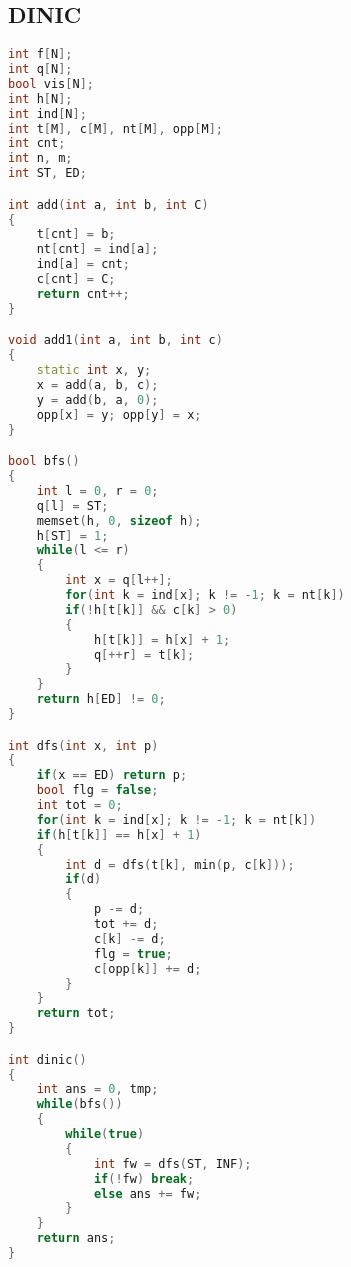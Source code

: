 ﻿\subsection{DINIC}
    \begin{lstlisting}[language=C++]
int f[N];
int q[N];
bool vis[N];
int h[N];
int ind[N];
int t[M], c[M], nt[M], opp[M];
int cnt;
int n, m;
int ST, ED;

int add(int a, int b, int C)
{
    t[cnt] = b;
    nt[cnt] = ind[a];
    ind[a] = cnt;
    c[cnt] = C;
    return cnt++;
}

void add1(int a, int b, int c)
{
    static int x, y;
    x = add(a, b, c);
    y = add(b, a, 0);
    opp[x] = y; opp[y] = x;
}

bool bfs()
{
    int l = 0, r = 0;
    q[l] = ST;
    memset(h, 0, sizeof h);
    h[ST] = 1;
    while(l <= r)
    {
        int x = q[l++];
        for(int k = ind[x]; k != -1; k = nt[k])
        if(!h[t[k]] && c[k] > 0)
        {
            h[t[k]] = h[x] + 1;
            q[++r] = t[k];
        }
    }
    return h[ED] != 0;
}

int dfs(int x, int p)
{
    if(x == ED) return p;
    bool flg = false;
    int tot = 0;
    for(int k = ind[x]; k != -1; k = nt[k])
    if(h[t[k]] == h[x] + 1)
    {
        int d = dfs(t[k], min(p, c[k]));
        if(d)
        {
            p -= d;
            tot += d;
            c[k] -= d;
            flg = true;
            c[opp[k]] += d;
        }
    }
    return tot;
}

int dinic()
{
    int ans = 0, tmp;
    while(bfs())
    {
        while(true)
        {
            int fw = dfs(ST, INF);
            if(!fw) break;
            else ans += fw;
        }
    }
    return ans;
}
\end{lstlisting}

